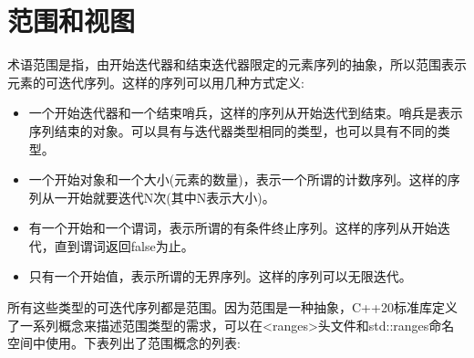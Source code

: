 \section{范围和视图}

术语范围是指，由开始迭代器和结束迭代器限定的元素序列的抽象，所以范围表示元素的可迭代序列。这样的序列可以用几种方式定义:

\begin{itemize}
\item
一个开始迭代器和一个结束哨兵，这样的序列从开始迭代到结束。哨兵是表示序列结束的对象。可以具有与迭代器类型相同的类型，也可以具有不同的类型。

\item
一个开始对象和一个大小(元素的数量)，表示一个所谓的计数序列。这样的序列从一开始就要迭代N次(其中N表示大小)。

\item
有一个开始和一个谓词，表示所谓的有条件终止序列。这样的序列从开始迭代，直到谓词返回false为止。

\item
只有一个开始值，表示所谓的无界序列。这样的序列可以无限迭代。
\end{itemize}

所有这些类型的可迭代序列都是范围。因为范围是一种抽象，C++20标准库定义了一系列概念来描述范围类型的需求，可以在<ranges>头文件和std::ranges命名空间中使用。下表列出了范围概念的列表:

